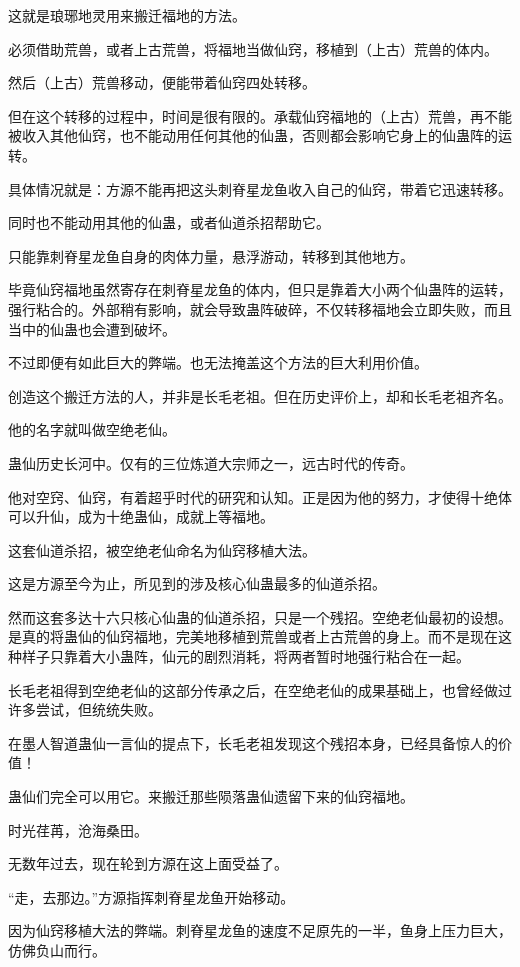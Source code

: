\begin{this_body}
这就是琅琊地灵用来搬迁福地的方法。

必须借助荒兽，或者上古荒兽，将福地当做仙窍，移植到（上古）荒兽的体内。

然后（上古）荒兽移动，便能带着仙窍四处转移。

但在这个转移的过程中，时间是很有限的。承载仙窍福地的（上古）荒兽，再不能被收入其他仙窍，也不能动用任何其他的仙蛊，否则都会影响它身上的仙蛊阵的运转。

具体情况就是：方源不能再把这头刺脊星龙鱼收入自己的仙窍，带着它迅速转移。

同时也不能动用其他的仙蛊，或者仙道杀招帮助它。

只能靠刺脊星龙鱼自身的肉体力量，悬浮游动，转移到其他地方。

毕竟仙窍福地虽然寄存在刺脊星龙鱼的体内，但只是靠着大小两个仙蛊阵的运转，强行粘合的。外部稍有影响，就会导致蛊阵破碎，不仅转移福地会立即失败，而且当中的仙蛊也会遭到破坏。

不过即便有如此巨大的弊端。也无法掩盖这个方法的巨大利用价值。

创造这个搬迁方法的人，并非是长毛老祖。但在历史评价上，却和长毛老祖齐名。

他的名字就叫做空绝老仙。

蛊仙历史长河中。仅有的三位炼道大宗师之一，远古时代的传奇。

他对空窍、仙窍，有着超乎时代的研究和认知。正是因为他的努力，才使得十绝体可以升仙，成为十绝蛊仙，成就上等福地。

这套仙道杀招，被空绝老仙命名为仙窍移植大法。

这是方源至今为止，所见到的涉及核心仙蛊最多的仙道杀招。

然而这套多达十六只核心仙蛊的仙道杀招，只是一个残招。空绝老仙最初的设想。是真的将蛊仙的仙窍福地，完美地移植到荒兽或者上古荒兽的身上。而不是现在这种样子只靠着大小蛊阵，仙元的剧烈消耗，将两者暂时地强行粘合在一起。

长毛老祖得到空绝老仙的这部分传承之后，在空绝老仙的成果基础上，也曾经做过许多尝试，但统统失败。

在墨人智道蛊仙一言仙的提点下，长毛老祖发现这个残招本身，已经具备惊人的价值！

蛊仙们完全可以用它。来搬迁那些陨落蛊仙遗留下来的仙窍福地。

时光荏苒，沧海桑田。

无数年过去，现在轮到方源在这上面受益了。

“走，去那边。”方源指挥刺脊星龙鱼开始移动。

因为仙窍移植大法的弊端。刺脊星龙鱼的速度不足原先的一半，鱼身上压力巨大，仿佛负山而行。


\end{this_body}
